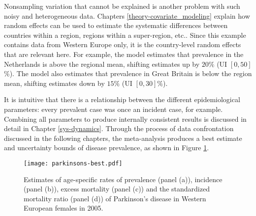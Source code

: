 Nonsampling variation that cannot be explained is another problem with
such noisy and heterogeneous data.  Chapters
\ref{theory-covariate_modeling} explain how random effects can be used
to estimate the systematic differences between countries within a
region, regions within a super-region, etc..  Since this example
contains data from Western Europe only, it is the country-level random
effects that are relevant here.  For example, the model estimates that
prevalence in the Netherlands is above the regional mean, shifting
estimates up by $20\%$ (UI $[0, 50]$\%).  The model also estimates
that prevalence in Great Britain is below the region mean, shifting estimates
down by $15\%$ (UI $[0, 30]\%$).

It is intuitive that there is a relationship between the
different epidemiological parameters: every prevalent case was once an incident
case, for example.  Combining all parameters to produce internally
consistent results is discussed in detail in Chapter
\ref{sys-dynamics}.  Through the process of data confrontation
discussed in the following chapters, the meta-analysis produces a best
estimate and uncertainty bounds of disease prevalence, as shown in
Figure \ref{fig:intro-parkinsons fit}.

    \begin{figure}[h]
        \begin{center}
            \texttt{[image: parkinsons-best.pdf]}
            \caption{Estimates of age-specific rates of
              prevalence (panel (a)), incidence (panel (b)),
              excess mortality (panel (c)) and the
              standardized mortality ratio (panel (d)) of Parkinson's
              disease in Western European females in 2005.}
            \label{fig:intro-parkinsons fit}
        \end{center}
    \end{figure}
